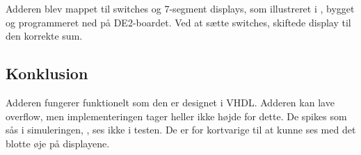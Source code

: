 \documentclass[12pt,a4paper]{article}
\begin{document}
Adderen blev mappet til switches og 7-segment displays, som illustreret i
, bygget og programmeret ned på DE2-boardet. 
Ved at sætte switches, skiftede display til den korrekte sum.

\subsection{Konklusion}

Adderen fungerer funktionelt som den er designet i VHDL.  Adderen kan lave
overflow, men implementeringen tager heller ikke højde for dette.  De spikes
som sås i simuleringen, , ses ikke i testen. 
De er for kortvarige til at kunne ses med det blotte øje på displayene.
\end{document}
